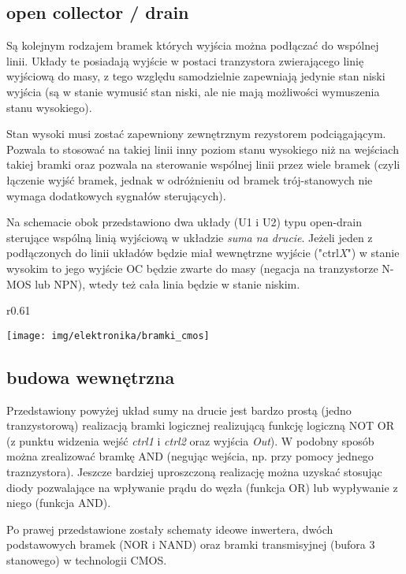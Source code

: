 \documentclass{pdfBooklets}
\begin{document}
\subsection{open collector / drain}
Są kolejnym rodzajem bramek których wyjścia można podłączać do wspólnej linii. Układy te posiadają wyjście w postaci tranzystora zwierającego linię wyjściową do masy, z tego względu samodzielnie zapewniają jedynie stan niski wyjścia (są w stanie wymusić stan niski, ale nie mają możliwości wymuszenia stanu wysokiego).

Stan wysoki musi zostać zapewniony zewnętrznym rezystorem podciągającym. Pozwala to stosować na takiej linii inny poziom stanu wysokiego niż na wejściach takiej bramki oraz pozwala na sterowanie wspólnej linii przez wiele bramek (czyli łączenie wyjść bramek, jednak w odróżnieniu od bramek trój-stanowych nie wymaga dodatkowych sygnałów sterujących).

Na schemacie obok przedstawiono dwa układy (U1 i U2) typu open-drain sterujące wspólną linią wyjściową w układzie \emph{suma na drucie}. Jeżeli jeden z podłączonych do linii układów będzie miał wewnętrzne wyjście ("ctrl\textit{X}") w stanie wysokim to jego wyjście OC będzie zwarte do masy (negacja na tranzystorze N-MOS lub NPN), wtedy też cała linia będzie w stanie niskim.


\begin{wrapfigure}{r}{0.61\textwidth}
  \begin{center}
    \vspace{-45pt}
    \texttt{[image: img/elektronika/bramki\_cmos]}
    \vspace{-35pt}
  \end{center}
\end{wrapfigure}
\subsection{budowa wewnętrzna}
Przedstawiony powyżej układ sumy na drucie jest bardzo prostą (jedno tranzystorową) realizacją bramki logicznej realizującą funkcję logiczną NOT OR (z punktu widzenia wejść \textit{ctrl1} i \textit{ctrl2} oraz wyjścia \textit{Out}).
W podobny sposób można zrealizować bramkę AND (negując wejścia, np. przy pomocy jednego traznzystora).
Jeszcze bardziej uproszczoną realizację można uzyskać stosując diody pozwalające na wpływanie prądu do węzła (funkcja OR) lub wypływanie z niego (funkcja AND).

Po prawej przedstawione zostały schematy ideowe inwertera, dwóch podstawowych bramek (NOR i NAND) oraz bramki transmisyjnej (bufora 3 stanowego) w technologii CMOS.
\end{document}
